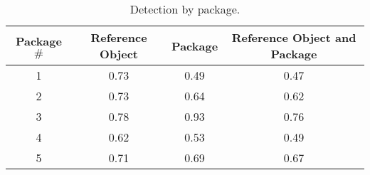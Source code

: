 \begin{table}[H]
\centering
\begin{tabular}{@{} *4c @{}}
\toprule
 \multicolumn{1}{c}{Package $\#$} & {Reference Object}  & {Package}  & {Reference Object and Package}  \\ 
\midrule
 1 & 0.73 & 0.49 & 0.47 \\ 
 2 & 0.73 & 0.64 & 0.62 \\
 3 & 0.78 & 0.93 & 0.76 \\
 4 & 0.62 & 0.53 & 0.49 \\
 5 & 0.71 & 0.69 & 0.67 \\
\bottomrule
 \end{tabular}
 \caption{Detection by package.}
\label{table:detection_by_package}
\end{table}